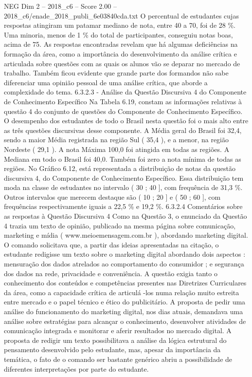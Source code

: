 \begin{textsample}{NEG Dim 2 – 2018\_c6 – Score 2.00 – 2018\_c6/enade\_2018\_publi\_6e03840cda.txt}
O percentual de estudantes cujas respostas atingiram um patamar mediano de nota, entre 40 a 70, foi de 28 \%.
Uma minoria, menos de 1 \% do total de participantes, conseguiu notas boas, acima de 75.
As respostas encontradas revelam que há algumas deficiências na formação da área, como a importância do desenvolvimento da análise crítica e articulada sobre questões com as quais os alunos vão se deparar no mercado de trabalho.
Também ficou evidente que grande parte dos formandos não sabe diferenciar uma opinião pessoal de uma análise crítica, que aborde a complexidade do tema. 6.3.2.3 - Análise da Questão Discursiva 4 do Componente de Conhecimento Específico Na Tabela 6.19, constam as informações relativas à questão 4 do conjunto de questões do Componente de Conhecimento Específico.
O desempenho dos estudantes de todo o Brasil nesta questão foi o mais alto entre as três questões discursivas desse componente.
A Média geral do Brasil foi 32,4, sendo a maior Média registrada na região Sul ( 35,4 ), e a menor, na região Nordeste ( 29,1 ).
A nota Máxima 100,0 foi atingida em todas as regiões.
A Mediana em todo o Brasil foi 40,0.
Também foi zero a nota mínima de todas as regiões.
No Gráfico 6.12, está representada a distribuição de notas da questão discursiva 4, do Componente de Conhecimento Específico.
Essa distribuição tem moda na classe de estudantes no intervalo ( 30 ; 40 ], com frequência de 31,3 \%.
Outros intervalos que merecem destaque são ( 10 ; 20 ] e ( 50 ; 60 ], com frequências respectivamente iguais a 22,5 \% e 19,2 \%. 6.3.2.4 Comentários sobre as respostas à Questão Discursiva 4 Como na Questão 3, o enunciado da Questão 4 trazia um texto de opinião, publicado na mesma página sobre comunicação, marketing e mídia ( www.meioemensagem.com.br ), abordando marketing digital.
O comando solicitava que, a partir das ideias apresentadas na citação, o estudante redigisse um texto sobre o marketing digital abordando dois aspectos : mensuração dos dados atrelados ao comportamento do consumidor ; e segurança dos dados na rede, privacidade e conveniência.
A questão exigia tanto o conhecimento dos conteúdos e competências presentes nas Diretrizes Curriculares da área, como a capacidade crítica de articulá -los numa relação muito estreita entre mercado e o papel técnico e ético do publicitário.
A proposta de pedir uma análise do funcionamento do marketing digital, nos dias atuais, demandava uma análise sobre estratégias para alcançar o conhecimento, desenvolver atividades de comunicação integrada e monitorar e aferir resultados no mercado digital.
A proposta de redigir um texto possibilitava a análise da lógica estrutural do pensamento desenvolvido pelo estudante, mas, apesar da importância da temática, o fato de o comando ser bastante genérico abriu a possibilidade de diferentes interpretações por parte do estudante.

\end{textsample}
